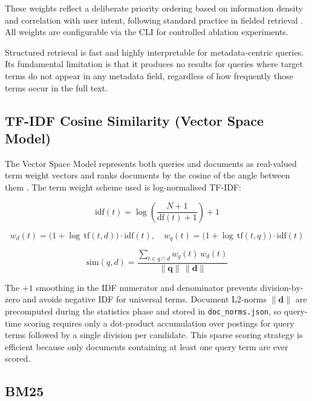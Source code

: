 \documentclass[sigconf]{acmart}
\begin{document}
These weights reflect a deliberate priority ordering based on information density and correlation with user intent, following standard practice in fielded retrieval \cite{manning2008}. All weights are configurable via the CLI for controlled ablation experiments.

Structured retrieval is fast and highly interpretable for metadata-centric queries. Its fundamental limitation is that it produces no results for queries where target terms do not appear in any metadata field, regardless of how frequently those terms occur in the full text.

\subsection{TF-IDF Cosine Similarity (Vector Space Model)}

The Vector Space Model represents both queries and documents as real-valued term weight vectors and ranks documents by the cosine of the angle between them \cite{salton1983}. The term weight scheme used is log-normalised TF-IDF:

\begin{equation}
\mathrm{idf}(t) = \log\!\left(\frac{N+1}{\mathrm{df}(t)+1}\right)+1
\end{equation}

\begin{equation}
w_d(t) = \bigl(1 + \log\,\mathrm{tf}(t,d)\bigr) \cdot \mathrm{idf}(t), \quad
w_q(t) = \bigl(1 + \log\,\mathrm{tf}(t,q)\bigr) \cdot \mathrm{idf}(t)
\end{equation}

\begin{equation}
\mathrm{sim}(q,d) = \frac{\displaystyle\sum_{t \in q \cap d} w_q(t)\,w_d(t)}{\lVert\mathbf{q}\rVert\,\lVert\mathbf{d}\rVert}
\end{equation}

The $+1$ smoothing in the IDF numerator and denominator prevents division-by-zero and avoids negative IDF for universal terms. Document L2-norms $\lVert\mathbf{d}\rVert$ are precomputed during the statistics phase and stored in \texttt{doc\_norms.json}, so query-time scoring requires only a dot-product accumulation over postings for query terms followed by a single division per candidate. This sparse scoring strategy is efficient because only documents containing at least one query term are ever scored.

\subsection{BM25}
\end{document}
